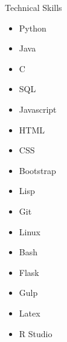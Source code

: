 \documentclass{resume} %
\begin{document}
\begin{rSection}{Technical Skills}

\begin{minipage}[t]{4cm}
    \begin{itemize}
        \item Python
        \item Java 
        \item C
        \item SQL
    \end{itemize}
\end{minipage}
\begin{minipage}[t]{4cm}
    \begin{itemize}
        \item Javascript
        \item HTML
        \item CSS
        \item Bootstrap
    \end{itemize}
\end{minipage}
\begin{minipage}[t]{4cm}
    \begin{itemize}
        \item Lisp        
        \item Git        
        \item Linux
        \item Bash
    \end{itemize}
\end{minipage}
\begin{minipage}[t]{4cm}
    \begin{itemize}
    		\item Flask
        \item Gulp
        \item Latex
        \item R Studio
    \end{itemize}
\end{minipage}

\end{rSection}

\end{document}
